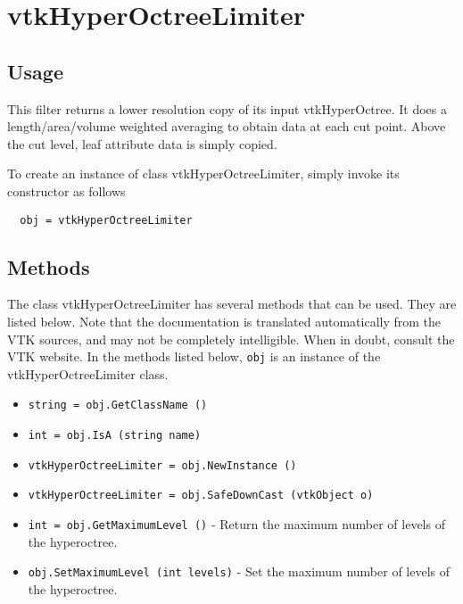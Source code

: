 \section{vtkHyperOctreeLimiter}

\subsection{Usage}

 This filter returns a lower resolution copy of its input vtkHyperOctree.
 It does a length/area/volume weighted averaging to obtain data at each
 cut point. Above the cut level, leaf attribute data is simply copied.

To create an instance of class vtkHyperOctreeLimiter, simply
invoke its constructor as follows
\begin{verbatim}
  obj = vtkHyperOctreeLimiter
\end{verbatim}
\subsection{Methods}

The class vtkHyperOctreeLimiter has several methods that can be used.
  They are listed below.
Note that the documentation is translated automatically from the VTK sources,
and may not be completely intelligible.  When in doubt, consult the VTK website.
In the methods listed below, \verb|obj| is an instance of the vtkHyperOctreeLimiter class.
\begin{itemize}
\item  \verb|string = obj.GetClassName ()|

\item  \verb|int = obj.IsA (string name)|

\item  \verb|vtkHyperOctreeLimiter = obj.NewInstance ()|

\item  \verb|vtkHyperOctreeLimiter = obj.SafeDownCast (vtkObject o)|

\item  \verb|int = obj.GetMaximumLevel ()| -  Return the maximum number of levels of the hyperoctree.

\item  \verb|obj.SetMaximumLevel (int levels)| -  Set the maximum number of levels of the hyperoctree.

\end{itemize}
